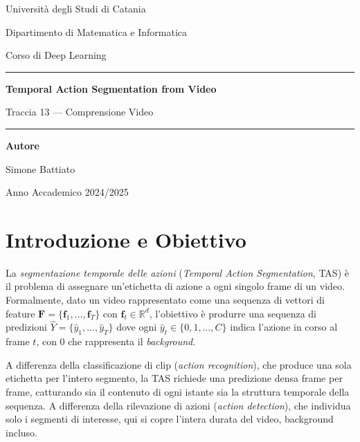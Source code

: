 \documentclass[12pt, a4paper]{article}
\begin{document}
\begin{titlepage}
  \centering\vspace*{2cm}
  {\Large Universit\`a degli Studi di Catania\par}\vspace{0.5cm}
  {\large Dipartimento di Matematica e Informatica\par}\vspace{0.5cm}
  {\large Corso di Deep Learning\par}\vspace{3cm}
  \rule{\linewidth}{0.5pt}\vspace{0.4cm}
  {\LARGE\textbf{Temporal Action Segmentation from Video}\par}\vspace{0.3cm}
  {\large Traccia 13 --- Comprensione Video\par}\vspace{0.3cm}
  \rule{\linewidth}{0.5pt}\vspace{3cm}
  {\large\textbf{Autore}\par}\vspace{0.3cm}
  {\large Simone Battiato\par}\vspace{2cm}
  {\large Anno Accademico 2024/2025\par}\vfill
\end{titlepage}

\tableofcontents\newpage

\section{Introduzione e Obiettivo}

La \textit{segmentazione temporale delle azioni}
(\textit{Temporal Action Segmentation}, TAS)
\`e il problema di assegnare un'etichetta di azione a ogni singolo frame
di un video. Formalmente, dato un video rappresentato come una sequenza
di vettori di feature $\mathbf{F} = \{\mathbf{f}_1, \ldots, \mathbf{f}_T\}$
con $\mathbf{f}_t \in \mathbb{R}^d$, l'obiettivo \`e produrre una sequenza
di predizioni $\hat{Y} = \{\hat{y}_1, \ldots, \hat{y}_T\}$ dove ogni
$\hat{y}_t \in \{0, 1, \ldots, C\}$ indica l'azione in corso al frame $t$,
con $0$ che rappresenta il \textit{background}.

A differenza della classificazione di clip (\textit{action recognition}),
che produce una sola etichetta per l'intero segmento, la TAS richiede una
predizione densa frame per frame, catturando sia il contenuto di ogni istante
sia la struttura temporale della sequenza. A differenza della rilevazione di
azioni (\textit{action detection}), che individua solo i segmenti di interesse,
qui si copre l'intera durata del video, background incluso.
\end{document}
